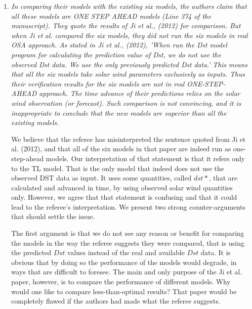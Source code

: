 \documentclass{article}
\begin{document}
\begin{enumerate}
\item \emph{In comparing their models with the existing six models, the authors claim that all these models are ONE STEP AHEAD models (Line 374 of the manuscript). They quote the results of Ji et al., (2012) for comparison. But when Ji et al. compared the six models, they did not run the six models in real OSA approach. As stated in Ji et al., (2012),  'When run the Dst model program for calculating the prediction value of Dst, we do not use the observed Dst data. We use the only previously predicted Dst data.' This means that all the six models take solar wind parameters exclusively as inputs. Thus their verification results for the six models are not in real ONE-STEP-AHEAD approach. The time advance of their predictions relies on the solar wind observation (or forecast). Such comparison is not convincing, and it is inappropriate to conclude that the new models are superior than all the existing models.}

We believe that the referee has misinterpreted the sentence quoted from Ji et al. (2012), and that all of the six models in that paper are indeed run as one-step-ahead models. Our interpretation of that statement is that it refers only to the TL model. That is the only model that indeed does not use the observed DST data as input. It uses some quantities, called $dst*$, that are calculated and advanced in time, by using observed solar wind quantities only. 
However, we agree that that statement is confusing and that it could lead to the referee's interpretation. We present two strong counter-arguments that should settle the issue.

The first argument is that we do not see any reason or benefit for comparing the models in the way the referee suggests they were compared, that is using the predicted $Dst$ values instead of the real and available $Dst$ data. It is obvious that by doing so the performance of the models would degrade, in ways that are difficult to foresee. The main and only purpose of the Ji et al. paper, however, is to compare the performance of different models. Why would one like to compare less-than-optimal results? That paper would be completely flawed if the authors had made what the referee suggests. 


\end{enumerate}
\end{document}
